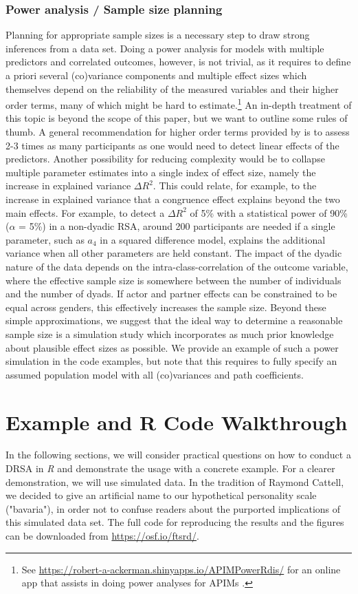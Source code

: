 \documentclass[jou,a4paper,draftfirst]{apa6}
\newcommand{\added}[1]{#1}
\begin{document}
\subsubsection{Power analysis / Sample size planning}
\added{Planning for appropriate sample sizes is a necessary step to draw strong inferences from a data set. Doing a power analysis for models with multiple predictors and correlated outcomes, however, is not trivial, as it requires to define a priori several (co)variance components and multiple effect sizes which themselves depend on the reliability of the measured variables and their higher order terms, many of which might be hard to estimate.\footnote{See \url{https://robert-a-ackerman.shinyapps.io/APIMPowerRdis/} for an online app that assists in doing power analyses for APIMs \parencite{Ackerman_Kenny_2016}.} An in-depth treatment of this topic is beyond the scope of this paper, but we want to outline some rules of thumb. A general recommendation for higher order terms provided by \textcite{Aiken_West_1991} is to assess 2-3 times as many participants as one would need to detect linear effects of the predictors. Another possibility for reducing complexity would be to collapse multiple parameter estimates into a single index of effect size, namely the increase in explained variance $\Delta R^2$. This could relate, for example, to the increase in explained variance that a congruence effect explains beyond the two main effects. For example, to detect a $\Delta R^2$ of 5\% with a statistical power of 90\% ($\alpha$ = 5\%) in a non-dyadic RSA, around 200 participants are needed if a single parameter, such as $a_4$ in a squared difference model, explains the additional variance when all other parameters are held constant. The impact of the dyadic nature of the data depends on the intra-class-correlation of the outcome variable, where the effective sample size is somewhere between the number of individuals and the number of dyads. If actor and partner effects can be constrained to be equal across genders, this effectively increases the sample size. Beyond these simple approximations, we suggest that the ideal way to determine a reasonable sample size is a simulation study \parencite{NestlerEtAl2015} which incorporates as much prior knowledge about plausible effect sizes as possible. We provide an example of such a power simulation in the code examples, but note that this requires to fully specify an assumed population model with all (co)variances and path coefficients.}

\section{Example and R Code Walkthrough} 
In the following sections, we will consider practical questions on how to conduct a DRSA in \textit{R} and demonstrate the usage with a concrete example. For a clearer demonstration, we will use simulated data. In the tradition of Raymond Cattell, we decided to give an artificial name to our hypothetical personality scale ("bavaria"), in order not to confuse readers about the purported implications of this simulated data set. The full code for reproducing the results and the figures can be downloaded from \url{https://osf.io/ftsrd/}.
\end{document}
